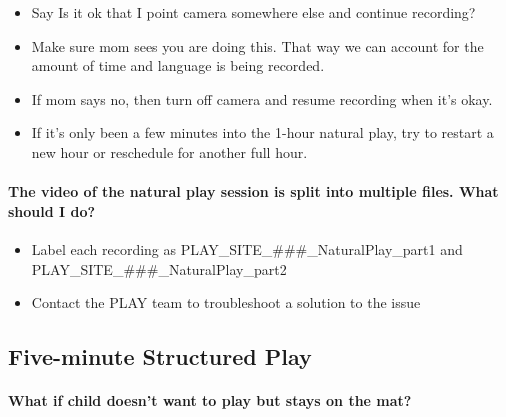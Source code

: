 \documentclass[
  12pt,
]{book}
\providecommand{\tightlist}{%
  \setlength{\itemsep}{0pt}\setlength{\parskip}{0pt}}
\begin{document}
\begin{itemize}
\tightlist
\item
  Say Is it ok that I point camera somewhere else and continue recording?\\
\item
  Make sure mom sees you are doing this. That way we can account for the amount of time and language is being recorded.
\item
  If mom says no, then turn off camera and resume recording when it's okay.
\item
  If it's only been a few minutes into the 1-hour natural play, try to restart a new hour or reschedule for another full hour.
\end{itemize}

\hypertarget{the-video-of-the-natural-play-session-is-split-into-multiple-files.-what-should-i-do}{%
\paragraph*{The video of the natural play session is split into multiple files. What should I do?}\label{the-video-of-the-natural-play-session-is-split-into-multiple-files.-what-should-i-do}}

\begin{itemize}
\tightlist
\item
  Label each recording as PLAY\_SITE\_\#\#\#\_NaturalPlay\_part1 and PLAY\_SITE\_\#\#\#\_NaturalPlay\_part2
\item
  Contact the PLAY team to troubleshoot a solution to the issue
\end{itemize}

\hypertarget{faqs_structured_play}{%
\subsection{Five-minute Structured Play}\label{faqs_structured_play}}

\hypertarget{what-if-child-doesnt-want-to-play-but-stays-on-the-mat}{%
\paragraph*{What if child doesn't want to play but stays on the mat?}\label{what-if-child-doesnt-want-to-play-but-stays-on-the-mat}}
\end{document}
